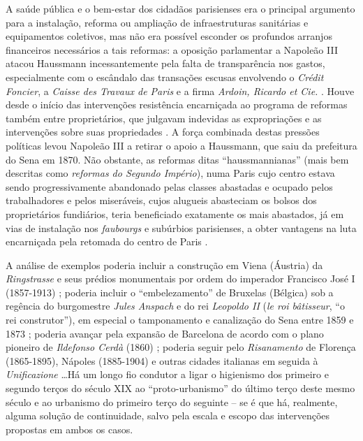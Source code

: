 A saúde pública e o bem-estar dos cidadãos parisienses era o principal argumento para a instalação, reforma ou ampliação de infraestruturas sanitárias e equipamentos coletivos, mas não era possível esconder os profundos arranjos financeiros necessários a tais reformas: a oposição parlamentar a Napoleão III atacou Haussmann incessantemente pela falta de transparência nos gastos, especialmente com o escândalo das transações escusas envolvendo o \textit{Crédit Foncier}, a \textit{Caisse des Travaux de Paris} e a firma \textit{Ardoin, Ricardo et Cie.} \cite{pinkney_paris_1957}. Houve desde o início das intervenções resistência encarniçada ao programa de reformas também entre proprietários, que julgavam indevidas as expropriações e as intervenções sobre suas propriedades \cite{paccoud_hauspropr_2012}. A força combinada destas pressões políticas levou Napoleão III a retirar o apoio a Haussmann, que saiu da prefeitura do Sena em 1870. Não obstante, as reformas ditas ``haussmannianas'' (mais bem descritas como \textit{reformas do Segundo Império}), numa Paris cujo centro estava sendo progressivamente abandonado pelas classes abastadas e ocupado pelos trabalhadores e pelos miseráveis, cujos alugueis abasteciam os bolsos dos proprietários fundiários, teria beneficiado exatamente os mais abastados, já em vias de instalação nos \textit{faubourgs} e subúrbios parisienses, a obter vantagens na luta encarniçada pela retomada do centro de Paris \cite{faure_paris_2004}.



A análise de exemplos poderia incluir a construção em Viena (Áustria) da \textit{Ringstrasse} e seus prédios monumentais por ordem do imperador Francisco José I (1857-1913) \cite{abercrombie_vienna_1910,abercrombie_vienna_1911,aman_vienna_1911}; poderia incluir o ``embelezamento'' de Bruxelas (Bélgica) sob a regência do burgomestre \textit{Jules Anspach} e do rei \textit{Leopoldo II} (\textit{le roi bâtisseur}, ``o rei construtor''), em especial o tamponamento e canalização do Sena entre 1859 e 1873 \cite{abercrombie_brussels1_1912,abercrombie_brussels2_1912,abercrombie_brussels3_1913}; poderia avançar pela expansão de Barcelona de acordo com o plano pioneiro de \textit{Ildefonso Cerdà} (1860) \cite{aibarbijker_barcelona_1997,ciervo_cerda_1976,soriaypuig_cerda_1995,wynn_barcelona_1979}; poderia seguir pelo \textit{Risanamento} de Florença (1865-1895), Nápoles (1885-1904) e outras cidades italianas em seguida à \textit{Unificazione} \cite{biocca_naples_1992,parisi_napoli_2001,piccinato_igiene_1989,rossi_napoli_2011}\dots Há um longo fio condutor a ligar o higienismo dos primeiro e segundo terços do século XIX ao ``proto-urbanismo'' do último terço deste mesmo século e ao urbanismo do primeiro terço do seguinte -- se é que há, realmente, alguma solução de continuidade, salvo pela escala e escopo das intervenções propostas em ambos os casos. 

